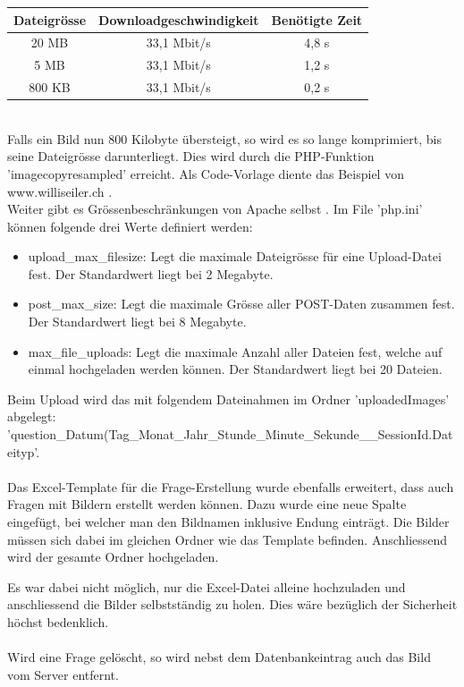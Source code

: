 \begin{tabular}{|c|c|c|}
	\hline 
	Dateigrösse & Downloadgeschwindigkeit & Benötigte Zeit \\ 
	\hline 
	20 MB & 33,1 Mbit/s & 4,8 s \\ 
	\hline 
	5 MB & 33,1 Mbit/s & 1,2 s \\ 
	\hline 
	800 KB & 33,1 Mbit/s & 0,2 s \\ 
	\hline 
\end{tabular}\\

Falls ein Bild nun 800 Kilobyte übersteigt, so wird es so lange komprimiert, bis seine Dateigrösse darunterliegt. Dies wird durch die PHP-Funktion 'imagecopyresampled' erreicht. Als Code-Vorlage diente das Beispiel von www.williseiler.ch \cite{willis_php}. \\

Weiter gibt es Grössenbeschränkungen von Apache selbst \cite{stackoverflow_largeFilePHP}. Im File 'php.ini' können folgende drei Werte definiert werden:
\begin{itemize}
	\item upload\_max\_filesize: Legt die maximale Dateigrösse für eine Upload-Datei fest. Der Standardwert liegt bei 2 Megabyte.
	\item post\_max\_size: Legt die maximale Grösse aller POST-Daten zusammen fest. Der Standardwert liegt bei 8 Megabyte.
	\item max\_file\_uploads: Legt die maximale Anzahl aller Dateien fest, welche auf einmal hochgeladen werden können. Der Standardwert liegt bei 20 Dateien.
\end{itemize}


Beim Upload wird das mit folgendem Dateinahmen im Ordner 'uploadedImages' abgelegt: 'question\_Datum(Tag\_Monat\_Jahr\_Stunde\_Minute\_Sekunde\_\_SessionId.Dateityp'.
\\
\\
Das Excel-Template für die Frage-Erstellung wurde ebenfalls erweitert, dass auch Fragen mit Bildern erstellt werden können. Dazu wurde eine neue Spalte eingefügt, bei welcher man den Bildnamen inklusive Endung einträgt. Die Bilder müssen sich dabei im gleichen Ordner wie das Template befinden. Anschliessend wird der gesamte Ordner hochgeladen.

Es war dabei nicht möglich, nur die Excel-Datei alleine hochzuladen und anschliessend die Bilder selbstständig zu holen. Dies wäre bezüglich der Sicherheit höchst bedenklich.
\\
\\
Wird eine Frage gelöscht, so wird nebst dem Datenbankeintrag auch das Bild vom Server entfernt.


